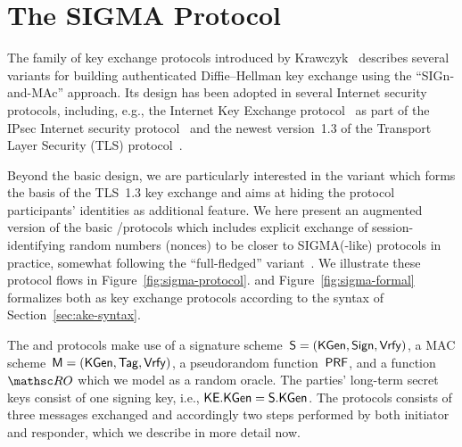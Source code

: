 \section{The SIGMA Protocol}
\label{sec:sigma}

The \SIGMA family of key exchange protocols introduced by Krawczyk~\cite{C:Krawczyk03,SIGMA-fullversion} describes several variants for building authenticated Diffie--Hellman key exchange using the ``SIGn-and-MAc'' approach.
Its design has been adopted in several Internet security protocols, including, e.g., the Internet Key Exchange protocol~\cite{rfc2409,rfc4306} as part of the IPsec Internet security protocol~\cite{rfc2401} and the newest version~1.3 of the Transport Layer Security (TLS) protocol~\cite{rfc8446}.

Beyond the basic \SIGMA design, we are particularly interested in the \SIGMAI variant which forms the basis of the TLS~1.3 key exchange and aims at hiding the protocol participants' identities as additional feature.
We here present an augmented version of the basic \SIGMA/\SIGMAI protocols which includes explicit exchange of session-identifying random numbers (nonces) to be closer to SIGMA(-like) protocols in practice,
somewhat following the ``full-fledged'' \SIGMA variant~\cite[Appendix~B]{SIGMA-fullversion}.
We illustrate these protocol flows in Figure~\ref{fig:sigma-protocol}. %
\iffull
 and Figure~\ref{fig:sigma-formal} formalizes both as key exchange protocols according to the syntax of Section~\ref{sec:ake-syntax}.
\else
\fi

The \SIGMA and \SIGMAI protocols make use of
a signature scheme~$\mathsf{S} = (\mathsf{KGen},\allowbreak \mathsf{Sign},\allowbreak \mathsf{Vrfy})$,
a MAC scheme~$\mathsf{M} = (\mathsf{KGen},\allowbreak \mathsf{Tag},\allowbreak \mathsf{Vrfy})$,
a pseudorandom function~$\mathsf{PRF}$,
and a function~$\RO$ which we model as a random oracle.
The parties' long-term secret keys consist of one signing key, i.e., $\mathsf{KE}.\mathsf{KGen} = \mathsf{S}.\mathsf{KGen}$.
The protocols consists of three messages exchanged and accordingly two steps performed by both initiator and responder,
which we describe in more detail now.

